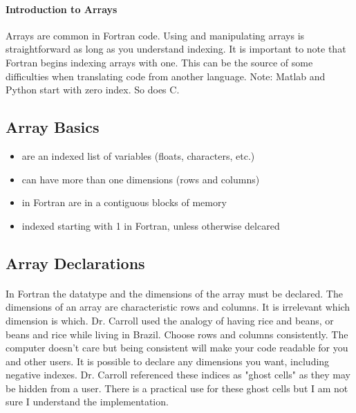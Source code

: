 \documentclass[11pt]{article}
\begin{document}
\paragraph{Introduction to Arrays}
Arrays are common in Fortran code. Using and manipulating arrays is straightforward as long as you understand indexing. It is important to note that Fortran begins indexing arrays with one. This can be the source of some difficulties when translating code from another language. Note: Matlab and Python start with zero index. So does C. \\

\subsection{Array Basics}

 \begin{itemize}
    \item are an indexed list of variables (floats, characters, etc.)
    \item can have more than one dimensions (rows and columns)
    \item in Fortran are in a contiguous blocks of memory
    \item indexed starting with 1 in Fortran, unless otherwise delcared
  \end{itemize}
  
\subsection{Array Declarations}

\paragraph{}	In Fortran the datatype and the dimensions of the array must be declared. The dimensions of an array are characteristic rows and columns. It is irrelevant which dimension is which. Dr. Carroll used the analogy of having rice and beans, or beans and rice while living in Brazil. Choose rows and columns consistently. The computer doesn't care but being consistent will make your code readable for you and other users. It is possible to declare any dimensions you want, including negative indexes. Dr. Carroll referenced these indices as "ghost cells" as they may be hidden from a user. There is a practical use for these ghost cells but I am not sure I understand the implementation.
\end{document}
